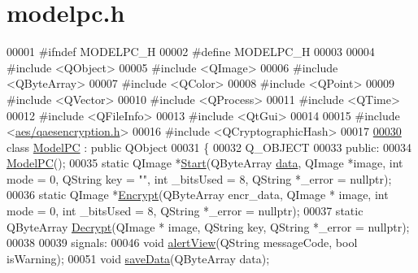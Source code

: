 \hypertarget{modelpc_8h_source}{\section{modelpc.\-h}
}

\begin{DoxyCode}
00001 \textcolor{preprocessor}{#ifndef MODELPC\_H}
00002 \textcolor{preprocessor}{}\textcolor{preprocessor}{#define MODELPC\_H}
00003 \textcolor{preprocessor}{}
00004 \textcolor{preprocessor}{#include <QObject>}
00005 \textcolor{preprocessor}{#include <QImage>}
00006 \textcolor{preprocessor}{#include <QByteArray>}
00007 \textcolor{preprocessor}{#include <QColor>}
00008 \textcolor{preprocessor}{#include <QPoint>}
00009 \textcolor{preprocessor}{#include <QVector>}
00010 \textcolor{preprocessor}{#include <QProcess>}
00011 \textcolor{preprocessor}{#include <QTime>}
00012 \textcolor{preprocessor}{#include <QFileInfo>}
00013 \textcolor{preprocessor}{#include <QtGui>}
00014 
00015 \textcolor{preprocessor}{#include <\hyperlink{qaesencryption_8h}{aes/qaesencryption.h}>}
00016 \textcolor{preprocessor}{#include <QCryptographicHash>}
00017 
\hypertarget{modelpc_8h_source_l00030}{}\hyperlink{class_model_p_c}{00030} \textcolor{keyword}{class }\hyperlink{class_model_p_c}{ModelPC} : \textcolor{keyword}{public} QObject
00031 \{
00032     Q\_OBJECT
00033 \textcolor{keyword}{public}:
00034     \hyperlink{class_model_p_c_ae12ebe65ec973c02a0de4850a7c1e31c}{ModelPC}();
00035     \textcolor{keyword}{static} QImage *\hyperlink{class_model_p_c_a77a3beaa87ab7d882215730c546a1c91}{Start}(QByteArray \hyperlink{namespace_errors_dict_setup_adf4c30d205d29df7343e26f7c62b0685}{data}, QImage *image, \textcolor{keywordtype}{int} mode = 0, QString key = \textcolor{stringliteral}{""}, \textcolor{keywordtype}{int} 
      \_bitsUsed = 8, QString *\_error = \textcolor{keyword}{nullptr});
00036     \textcolor{keyword}{static} QImage *\hyperlink{class_model_p_c_a132a399bf401a97106c2368e6e9e8792}{Encrypt}(QByteArray encr\_data, QImage * image, \textcolor{keywordtype}{int} mode = 0, \textcolor{keywordtype}{int} \_bitsUsed = 8, 
      QString *\_error = \textcolor{keyword}{nullptr});
00037     \textcolor{keyword}{static} QByteArray \hyperlink{class_model_p_c_ac245b9b6d618f421c0ccfa66d97ac905}{Decrypt}(QImage * image, QString key, QString *\_error = \textcolor{keyword}{nullptr});
00038 
00039 signals:
00046     \textcolor{keywordtype}{void} \hyperlink{class_model_p_c_af0217a7ca5671e26090dc50a5dccdaf5}{alertView}(QString messageCode, \textcolor{keywordtype}{bool} isWarning);
00051     \textcolor{keywordtype}{void} \hyperlink{class_model_p_c_a0855107fb0ccc247cd9e893fae9bb08a}{saveData}(QByteArray data);

\end{DoxyCode}
